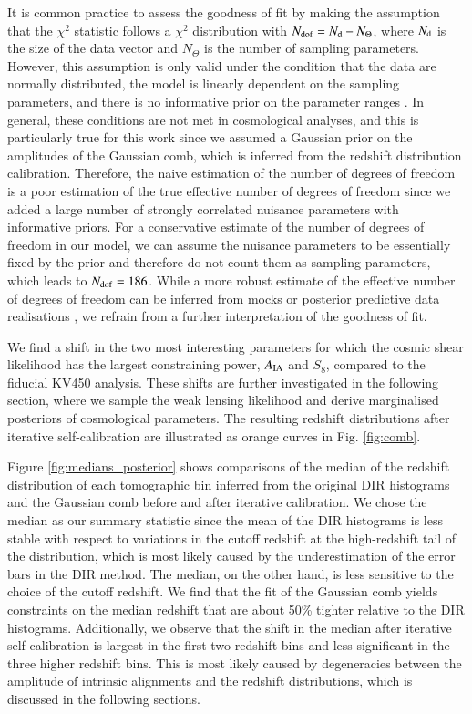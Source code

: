 \documentclass{aa}
\begin{document}
It is common practice to assess the goodness of fit by making the assumption that the $\chi^2$ statistic follows a $\chi^2$ distribution with $N_{\rm dof} = N_{\rm d} - N_\Theta$, where $N_{\rm d}$ is the size of the data vector and $N_\Theta$ is the number of sampling parameters. However, this assumption is only valid under the condition that the data are normally distributed, the model is linearly dependent on the sampling parameters, and there is no informative prior on the parameter ranges \citep[see for instance][]{joachimi20}. In general, these conditions are not met in cosmological analyses, and this is particularly true for this work since we assumed a Gaussian prior on the amplitudes of the Gaussian comb, which is inferred from the redshift distribution calibration. Therefore, the naive estimation of the number of degrees of freedom is a poor estimation of the true effective number of degrees of freedom since we added a large number of strongly correlated nuisance parameters with informative priors. For a conservative estimate of the number of degrees of freedom in our model, we can assume the nuisance parameters to be essentially fixed by the prior and therefore do not count them as sampling parameters, which leads to  $N_{\rm dof} = 186$. While a more robust estimate of the effective number of degrees of freedom can be inferred from mocks or posterior predictive data realisations \citep{spiegelhalter02, handley19, raveri19,joachimi20}, we refrain from a further interpretation of the goodness of fit.

We find a shift in the two most interesting parameters for which the cosmic shear likelihood has the largest constraining power, $A_{\rm IA}$ and $S_8$, compared to the fiducial KV450 analysis. These shifts are further investigated in the following section, where we sample the weak lensing likelihood and derive marginalised posteriors of cosmological parameters. The resulting redshift distributions after iterative self-calibration are illustrated as orange curves in Fig. \ref{fig:comb}. 

Figure \ref{fig:medians_posterior} shows comparisons of the median of the redshift distribution of each tomographic bin inferred from the original DIR histograms and the Gaussian comb before and after iterative calibration. We chose the median as our summary statistic since the mean of the DIR histograms is less stable with respect to variations in the cutoff redshift at the high-redshift tail of the distribution, which is most likely caused by the underestimation of the error bars in the DIR method. The median, on the other hand, is less sensitive to the choice of the cutoff redshift. We find that the fit of the Gaussian comb yields constraints on the median redshift that are about 50\% tighter   relative to the DIR histograms. Additionally, we observe that the shift in the median after iterative self-calibration is largest in the first two redshift bins and less significant in the three higher redshift bins. This is most likely caused by degeneracies between the amplitude of intrinsic alignments and the redshift distributions, which is discussed in the following sections. 
\end{document}
